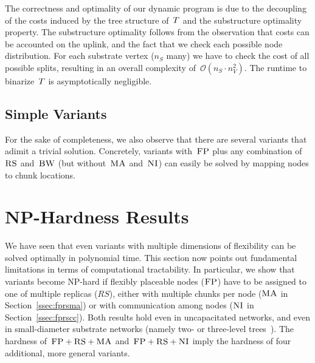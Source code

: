 The correctness and optimality of our dynamic program
is due to the decoupling of the costs induced by the tree
structure of~$T$ and the  substructure
optimality property.
The substructure optimality follows from the observation that
costs can be accounted on the uplink, and the fact
 that we check each possible node distribution.
For each substrate vertex ($n_S$ many) we have
to check the cost of all possible splits,
resulting in an overall complexity of~$\mathcal{O}(n_S \cdot n_V^2)$.
The runtime to binarize~$T$ is asymptotically negligible.


\subsection{Simple Variants}



For the sake of completeness, we also observe that there are
several variants that adimit a trivial solution. Concretely, variants with~$\textsc{FP}$
plus any combination of
$\textsc{RS}$ and~$\textsc{BW}$ (but without~$\textsc{MA}$ and~$\textsc{NI}$) can easily be solved by
mapping
nodes to chunk locations.

\section{NP-Hardness Results}\label{sec:np}

We have seen that even variants with multiple dimensions of
flexibility can be solved optimally in polynomial time.
This section now points out fundamental
limitations in terms of computational tractability.
In particular, we
show that variants become NP-hard if flexibly placeable nodes ($\textsc{FP}$) have to be assigned to one of multiple replicas ($RS$), either with multiple chunks per node ($\textsc{MA}$ in Section~\ref{ssec:fprsma}) or with communication among nodes ($\textsc{NI}$ in Section~\ref{ssec:fprscc}).
Both results hold even in uncapacitated networks, and even in small-diameter
substrate networks (namely two- or three-level trees~\cite{fattree}).
The hardness of~$\textsc{FP}+\textsc{RS}+\textsc{MA}$ and~$\textsc{FP}+\textsc{RS}+\textsc{NI}$ imply
the hardness of four additional, more general variants.

